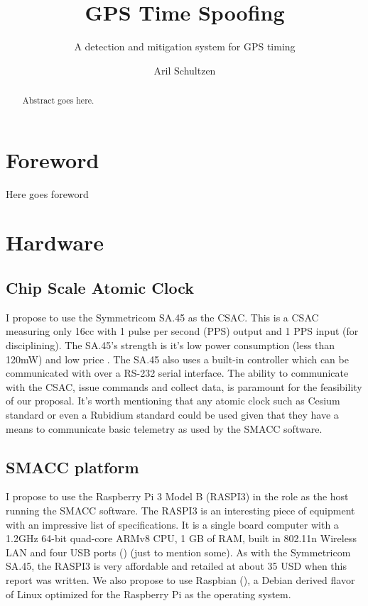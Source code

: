 \documentclass[12pt,english,a4paper]{report}
\title{GPS Time Spoofing}
\subtitle{A detection and mitigation system for GPS timing}
\author{Aril Schultzen}
\begin{document}
\duoforside[dept={Institutt for informatikk},
program={Informatikk: programmering og nettverk},
long]

\begin{abstract}
Abstract goes here.
\end{abstract}

\chapter*{Foreword}
Here goes foreword

\thispagestyle{empty}
\setcounter{page}{0}
\tableofcontents
\thispagestyle{empty}
\setcounter{page}{0}
\thispagestyle{empty}
\setcounter{page}{0}
\clearpage
\setcounter{page}{1}





\chapter{Hardware}

\section{Chip Scale Atomic Clock}
I propose to use the Symmetricom SA.45 as the CSAC. This is a CSAC measuring only 16cc with 1 pulse per second (PPS) output and 1 PPS input (for disciplining). The SA.45's strength is it's low power consumption (less than 120mW) and low price \cite{SADS}. The SA.45 also uses a built-in controller which can be communicated with over a RS-232 serial interface. The ability to communicate with the CSAC, issue commands and collect data, is paramount for the feasibility of our proposal. It's worth mentioning that any atomic clock such as Cesium standard or even a Rubidium standard could be used given that they have a means to communicate basic telemetry as used by the SMACC software.

\section{SMACC platform}
I propose to use the Raspberry Pi 3 Model B (RASPI3) in the role as the host running the SMACC software. The RASPI3 is an interesting piece of equipment with an impressive list of specifications. It is a single board computer with a 1.2GHz 64-bit quad-core ARMv8 CPU, 1 GB of RAM, built in 802.11n Wireless LAN and four USB ports (\cite{RASPI}) (just to mention some). As with the Symmetricom SA.45, the RASPI3 is very affordable and retailed at about 35 USD when this report was written. We also propose to use Raspbian (\cite{RASPBIAN}), a Debian derived flavor of Linux optimized for the Raspberry Pi as the operating system. 
\end{document}
